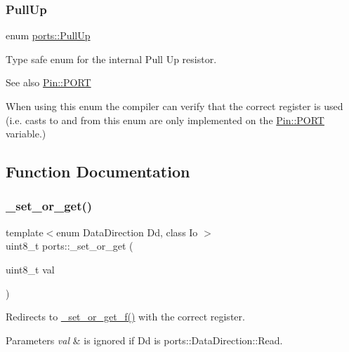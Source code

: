 \subsubsection{\texorpdfstring{Pull\+Up}{PullUp}}
{\footnotesize\ttfamily enum \hyperlink{namespaceports_a49bf0ccedb4cfed89a328574e53bec07}{ports\+::\+Pull\+Up}\hspace{0.3cm}{\ttfamily [strong]}}



Type safe enum for the internal Pull Up resistor. 

\begin{DoxySeeAlso}{See also}
\hyperlink{structports_1_1Pin_aaa08f0eb17ef31d9f46d65d50c8a093e}{Pin\+::\+P\+O\+RT}
\end{DoxySeeAlso}
When using this enum the compiler can verify that the correct register is used (i.\+e. casts to and from this enum are only implemented on the \hyperlink{structports_1_1Pin_aaa08f0eb17ef31d9f46d65d50c8a093e}{Pin\+::\+P\+O\+RT} variable.) 

\subsection{Function Documentation}
\hypertarget{namespaceports_aa339a9d178cb414c4cf243450d5887d2}{}\label{namespaceports_aa339a9d178cb414c4cf243450d5887d2} 
\subsubsection{\texorpdfstring{\+\_\+set\+\_\+or\+\_\+get()}{\_set\_or\_get()}}
{\footnotesize\ttfamily template$<$enum Data\+Direction Dd, class Io $>$ \\
uint8\+\_\+t ports\+::\+\_\+set\+\_\+or\+\_\+get (\begin{DoxyParamCaption}\item[{uint8\+\_\+t}]{val }\end{DoxyParamCaption})}



Redirects to \hyperlink{namespaceports_a75686ee2e9a291c0095dec6d73e4af8d}{\+\_\+set\+\_\+or\+\_\+get\+\_\+f()} with the correct register. 


\begin{DoxyParams}{Parameters}
{\em val} & is ignored if Dd is ports\+::\+Data\+Direction\+::\+Read. \\
\hline
\end{DoxyParams}

